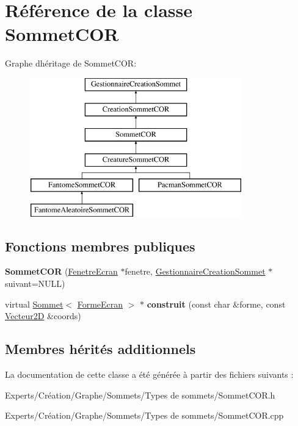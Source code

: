 \hypertarget{class_sommet_c_o_r}{}\section{Référence de la classe Sommet\+C\+OR}
\label{class_sommet_c_o_r}
Graphe d\textquotesingle{}héritage de Sommet\+C\+OR\+:\begin{figure}[H]
\begin{center}
\leavevmode
\includegraphics[height=6.000000cm]{class_sommet_c_o_r}
\end{center}
\end{figure}
\subsection*{Fonctions membres publiques}
\begin{DoxyCompactItemize}
\item 
\mbox{\label{class_sommet_c_o_r_aeb039acf5ae0cff9fb399532d8a4c809}} 
{\bfseries Sommet\+C\+OR} (\mbox{\hyperlink{class_fenetre_ecran}{Fenetre\+Ecran}} $\ast$fenetre, \mbox{\hyperlink{class_gestionnaire_creation_sommet}{Gestionnaire\+Creation\+Sommet}} $\ast$suivant=N\+U\+LL)
\item 
\mbox{\label{class_sommet_c_o_r_ae0699ffe8a55ecd0b2506642ba5382be}} 
virtual \mbox{\hyperlink{class_sommet}{Sommet}}$<$ \mbox{\hyperlink{class_forme_ecran}{Forme\+Ecran}} $>$ $\ast$ {\bfseries construit} (const char \&forme, const \mbox{\hyperlink{class_vecteur2_d}{Vecteur2D}} \&coords)
\end{DoxyCompactItemize}
\subsection*{Membres hérités additionnels}


La documentation de cette classe a été générée à partir des fichiers suivants \+:\begin{DoxyCompactItemize}
\item 
Experts/\+Création/\+Graphe/\+Sommets/\+Types de sommets/Sommet\+C\+O\+R.\+h\item 
Experts/\+Création/\+Graphe/\+Sommets/\+Types de sommets/Sommet\+C\+O\+R.\+cpp\end{DoxyCompactItemize}
